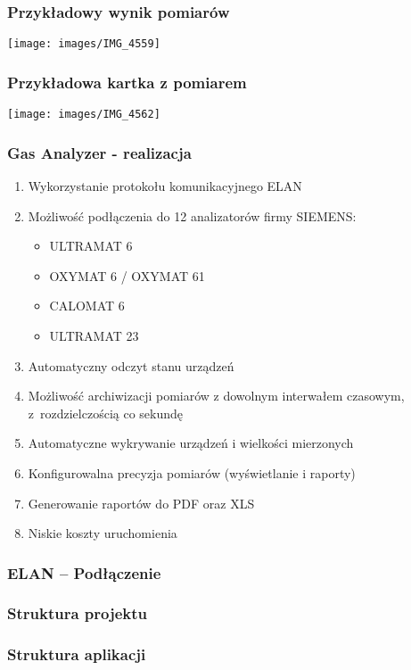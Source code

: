\documentclass[ucs]{beamer}
\begin{document}
\begin{frame}
\frametitle{Przykładowy wynik pomiarów}
\begin{center}
\texttt{[image: images/IMG\_4559]}
\end{center}
\end{frame}

\begin{frame}
\frametitle{Przykładowa kartka z pomiarem}
\begin{center}
\texttt{[image: images/IMG\_4562]}
\end{center}
\end{frame}

\begin{frame}
\frametitle{Gas Analyzer - realizacja}
\begin{enumerate}
\item Wykorzystanie protokołu komunikacyjnego ELAN
\item Możliwość podłączenia do 12 analizatorów firmy SIEMENS:
\begin{itemize}
\item ULTRAMAT 6
\item OXYMAT 6 / OXYMAT 61
\item CALOMAT 6
\item ULTRAMAT 23
\end{itemize}
\item Automatyczny odczyt stanu urządzeń
\item Możliwość archiwizacji pomiarów z dowolnym interwałem czasowym, z~rozdzielczością co sekundę
\item Automatyczne wykrywanie urządzeń i wielkości mierzonych
\item Konfigurowalna precyzja pomiarów (wyświetlanie i raporty)
\item Generowanie raportów do PDF oraz XLS
\item Niskie koszty uruchomienia
\end{enumerate}
\end{frame}

\begin{frame}
\frametitle{ELAN -- Podłączenie}

\end{frame}

\begin{frame}
\frametitle{Struktura projektu}

\end{frame}

\begin{frame}
\frametitle{Struktura aplikacji}
\begin{center}

\end{center}
\end{frame}
\end{document}
